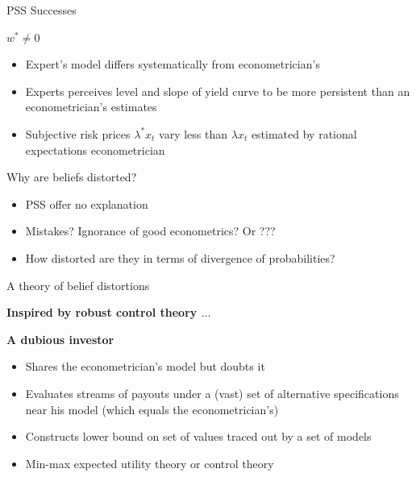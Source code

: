 \documentclass{beamer}
\theoremstyle{Definition}
\begin{document}



\begin{frame}{PSS Successes}

$w^* \neq 0$

\begin{itemize}
\item Expert's model differs systematically from econometrician's
\item Experts perceives  level and slope of  yield curve to be more persistent than an econometrician's estimates
\item Subjective risk prices  $\lambda^* x_t $ vary less than $\lambda x_t$ estimated by  rational expectations econometrician
\end{itemize}


\end{frame}

\begin{frame}{Why are beliefs distorted?}

\begin{itemize}
\item PSS offer  no explanation
\item Mistakes? Ignorance of good econometrics? Or ???
\item  How distorted  are they in terms of divergence  of probabilities?
\end{itemize}

\end{frame}

\begin{frame}{A theory of belief distortions}

\textbf{Inspired by  robust control theory $\ldots$}

\textbf{A dubious investor}%

\begin{itemize}

\item Shares the econometrician's model but doubts it
\item Evaluates  streams of payouts under a (vast) set of alternative specifications near his
model (which equals the econometrician's)
\item Constructs lower bound on  set of values  traced out by a set of models
\item Min-max expected utility theory or control theory
\end{itemize}

\end{frame}
\end{document}

